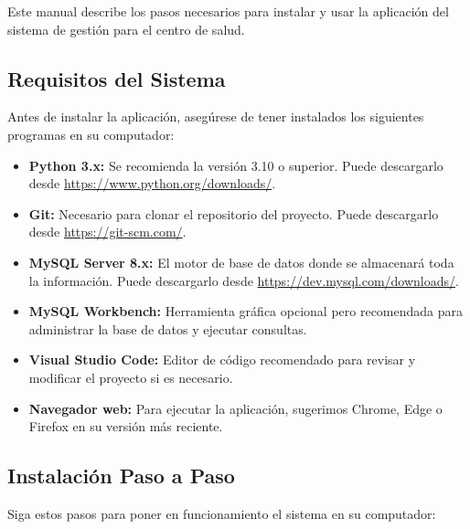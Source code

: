 \documentclass[12pt,a4paper]{article}
\begin{document}
Este manual describe los pasos necesarios para instalar y usar la aplicaci\'on del sistema de gesti\'on para el centro de salud.

\subsection{Requisitos del Sistema}

Antes de instalar la aplicaci\'on, aseg\'urese de tener instalados los siguientes programas en su computador:

\begin{itemize}
    \item \textbf{Python 3.x:} Se recomienda la versi\'on 3.10 o superior. Puede descargarlo desde \url{https://www.python.org/downloads/}.
    \item \textbf{Git:} Necesario para clonar el repositorio del proyecto. Puede descargarlo desde \url{https://git-scm.com/}.
    \item \textbf{MySQL Server 8.x:} El motor de base de datos donde se almacenar\'a toda la informaci\'on. Puede descargarlo desde \url{https://dev.mysql.com/downloads/}.
    \item \textbf{MySQL Workbench:} Herramienta gr\'afica opcional pero recomendada para administrar la base de datos y ejecutar consultas.
    \item \textbf{Visual Studio Code:} Editor de c\'odigo recomendado para revisar y modificar el proyecto si es necesario.
    \item \textbf{Navegador web:} Para ejecutar la aplicaci\'on, sugerimos Chrome, Edge o Firefox en su versi\'on m\'as reciente.
\end{itemize}

\subsection{Instalaci\'on Paso a Paso}

Siga estos pasos para poner en funcionamiento el sistema en su computador:
\end{document}
